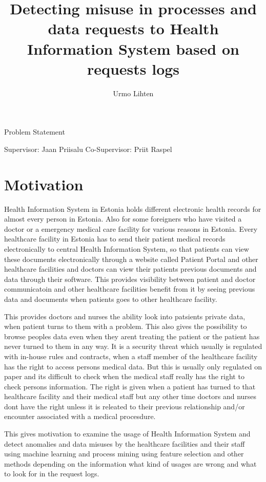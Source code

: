 \documentclass[12pt]{article}
\title{Detecting misuse in processes and data requests to Health Information System based on requests logs}
\author{Urmo Lihten}
\begin{document}

\maketitle

\begin{center}
	Problem Statement
\end{center}
\begin{flushright}
	Supervisor: Jaan Priisalu
	Co-Supervisor: Priit Raspel
\end{flushright}

\section{Motivation}
Health Information System in Estonia holds different electronic health records for almost every person in Estonia. Also for some foreigners who have visited a doctor or a emergency medical care facility for various reasons in Estonia. 
Every healthcare facility in Estonia has to send their patient medical records electronically to central Health Information System, so that patients can view these documents electronically through a website called Patient Portal and other healthcare facilities and doctors can view their patients previous documents and data through their software. This provides visibility between patient and doctor communicatoin and other healthcare facilities benefit from it by seeing previous data and documents when patients goes to other healthcare facility. 

This provides doctors and nurses the ability look into patsients private data, when patient turns to them with a problem. This also gives the possibility to browse peoples data even when they arent treating the patient or the patient has never turned to them in any way. It is a security threat which usually is regulated with in-house rules and contracts, when a staff member of the healthcare facility has the right to access persons medical data. But this is usually only regulated on paper and its difficult to check when the medical staff really has the right to check persons information. The right is given when a patient has turned to that healthcare facility and their medical staff but any other time doctors and nurses dont have the right unless it is releated to their previous relationship and/or encounter associated with a medical procesdure. 

This gives motivation to examine the usage of Health Information System and detect anomalies and data misuses by the healthcare facilities and their staff using machine learning and process mining using feature selection and other methods depending on the information what kind of usages are wrong and what to look for in the request logs.
\end{document}
